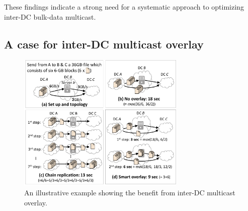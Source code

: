 \vspace{0.1cm}
These findings indicate a strong need for a systematic approach
to optimizing inter-DC bulk-data multicast.


%
%
%
%

\subsection{A case for inter-DC multicast overlay}
\label{subsec:motivation:case-for}


\begin{figure}[t]
\centering
\includegraphics[width=80mm]{images/example-junchen.pdf}
\caption{An illustrative example showing the benefit from inter-DC multicast overlay.}
\label{fig:case:example}
\vspace{-0.4cm}
\end{figure}

